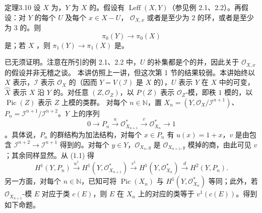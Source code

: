 \begin{SGAresult}{定理}{3.10}
设 $X$ 为，$Y$ 为 $X$ 的。假设有 $\operatorname{Leff}(X,Y)$（参见例 2.1、2.2）。再假设：对 $Y$ 的每个 $U$ 及每个 $x\in X-U$， $\mathcal O_{X,x}$ 或者是至少为 $2$ 的环，或者是至少为 $3$ 的。则
\[\pi_0(Y)\longrightarrow\pi_0(X)\]
是；若 $X$ ，则 $\pi_1(Y)\to\pi_1(X)$ 是。
\end{SGAresult}
已无须证明。注意在所引的例 2.1、2.2 中，$U$ 的补集都是个的并，因此关于 $\mathcal O_{X,x}$ 的假设并非无稽之谈。
本讲仿照上一讲，但这次第 1 节的结果较弱。本讲始终以 $X$ 表示，$\mathcal I$ 表示 $\mathcal O_X$ 的（因而 $Y=V(\mathcal I)$ 是 $X$ 的），$U$ 表示 $Y$ 在 $X$ 中的可变，$\widehat X$ 表示 $X$ 沿 $Y$ 的。对任意 $(Z,\mathcal O_Z)$，以 $P(Z)$ 表示 $\mathcal O_Z$-模，即秩 $1$ 模的，以 $\operatorname{Pic}(Z)$ 表示 $Z$ 上模的类群。
对每个 $n\in\mathbb N$，置 $X_n=(Y,\mathcal O_X/\mathcal I^{n+1})$、$P_n=\mathcal I^{n+1}/\mathcal I^{n+2}$。$Y$ 上的序列
\[0\longrightarrow P_n\xrightarrow{u}\mathcal O^*_{X_{n+1}}\xrightarrow{v}\mathcal O^*_{X_n}\longrightarrow1\tag{1.1}\]
。具体说，$P_n$ 的群结构为加法结构，对每个 $x\in P_n$ 有 $u(x)=1+x$，$v$ 是由包含 $\mathcal I^{n+2}\to\mathcal I^{n+1}$ 得到的。对每个 $y\in Y$，$\mathcal O_{X_n,y}$ 是 $\mathcal O_{X_{n+1},y}$ 模掉的商，由此可见 $v$ ；其余同样显然。从 (1.1) 得
\[H^1(Y,P_n)\xrightarrow{u^1}H^1(Y,\mathcal O^*_{X_{n+1}})\xrightarrow{v^1}H^1(Y,\mathcal O^*_{X_n})\xrightarrow{d}H^2(Y,P_n).\tag{*}\]
另一方面，对每个 $n\in\mathbb N$，已知可将 $\operatorname{Pic}(X_n)$ 与 $H^1(Y,\mathcal O^*_{X_n})$ 等同；此外，若 $\mathcal O_{X_{n+1}}$-模 $E$ 对应于类 $c(E)$，则 $E$ 在 $X_n$ 上的对应的类等于 $v^1(c(E))$。得到如下命题。

